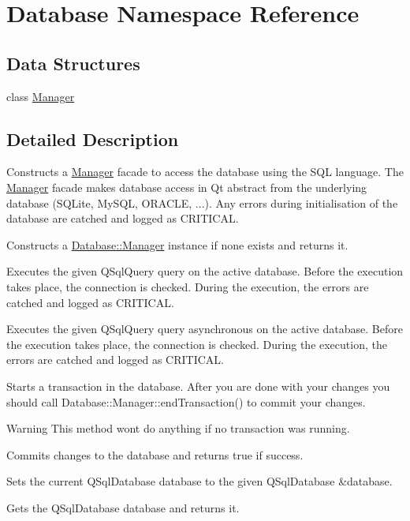 \hypertarget{namespaceDatabase}{}\section{Database Namespace Reference}
\label{namespaceDatabase}
\subsection*{Data Structures}
\begin{DoxyCompactItemize}
\item 
class \mbox{\hyperlink{classDatabase_1_1Manager}{Manager}}
\end{DoxyCompactItemize}


\subsection{Detailed Description}
Constructs a \mbox{\hyperlink{classDatabase_1_1Manager}{Manager}} facade to access the database using the S\+QL language. The \mbox{\hyperlink{classDatabase_1_1Manager}{Manager}} facade makes database access in Qt abstract from the underlying database (S\+Q\+Lite, My\+S\+QL, O\+R\+A\+C\+LE, ...). Any errors during initialisation of the database are catched and logged as C\+R\+I\+T\+I\+C\+AL.

Constructs a \mbox{\hyperlink{classDatabase_1_1Manager}{Database\+::\+Manager}} instance if none exists and returns it.

Executes the given Q\+Sql\+Query query on the active database. Before the execution takes place, the connection is checked. During the execution, the errors are catched and logged as C\+R\+I\+T\+I\+C\+AL.

Executes the given Q\+Sql\+Query query asynchronous on the active database. Before the execution takes place, the connection is checked. During the execution, the errors are catched and logged as C\+R\+I\+T\+I\+C\+AL.

Starts a transaction in the database. After you are done with your changes you should call Database\+::\+Manager\+::end\+Transaction() to commit your changes.

\begin{DoxyWarning}{Warning}
This method won\textquotesingle{}t do anything if no transaction was running.
\end{DoxyWarning}
Commits changes to the database and returns true if success.

Sets the current Q\+Sql\+Database database to the given Q\+Sql\+Database \&database.

Gets the Q\+Sql\+Database database and returns it. 
